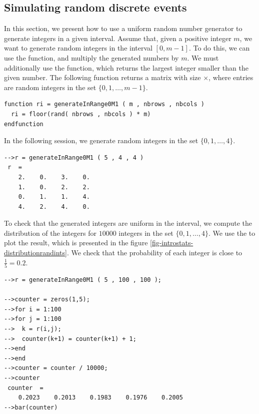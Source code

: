 \subsection{Simulating random discrete events}

In this section, we present how to use a uniform 
random number generator to generate integers in a given 
interval.
Assume that, given a positive integer $m$, we want to generate 
random integers in the interval $[0,m-1]$. 
To do this, we can use the  function, and 
multiply the generated numbers by $m$. We must 
additionally use the  function, which 
returns the largest integer smaller than the given number.
The following function returns a matrix with size $\times$,
where entries are random integers in the set $\{0,1,\ldots,m-1\}$. 
\lstset{language=scilabscript}
\begin{lstlisting}
function ri = generateInRange0M1 ( m , nbrows , nbcols )
  ri = floor(rand( nbrows , nbcols ) * m)
endfunction 
\end{lstlisting}

In the following session, we generate random integers in the 
set $\{0,1,\ldots,4\}$.

\lstset{language=scilabscript}
\begin{lstlisting}
-->r = generateInRange0M1 ( 5 , 4 , 4 )
 r  =
    2.    0.    3.    0.  
    1.    0.    2.    2.  
    0.    1.    1.    4.  
    4.    2.    4.    0.  
\end{lstlisting}

To check that the generated integers are uniform in the interval,
we compute the distribution of the integers for $10000$ integers
in the set $\{0,1,\ldots,4\}$. We use the  
to plot the result, which is presented in the figure 
\ref{fig-introstats-distributionrandints}.
We check that the probability of each integer is close to 
$\frac{1}{5}=0.2$.

\lstset{language=scilabscript}
\begin{lstlisting}
-->r = generateInRange0M1 ( 5 , 100 , 100 );
 
-->counter = zeros(1,5);
-->for i = 1:100
-->for j = 1:100
-->  k = r(i,j);
-->  counter(k+1) = counter(k+1) + 1;
-->end
-->end
-->counter = counter / 10000;
-->counter
 counter  =
    0.2023    0.2013    0.1983    0.1976    0.2005  
-->bar(counter)
\end{lstlisting}

